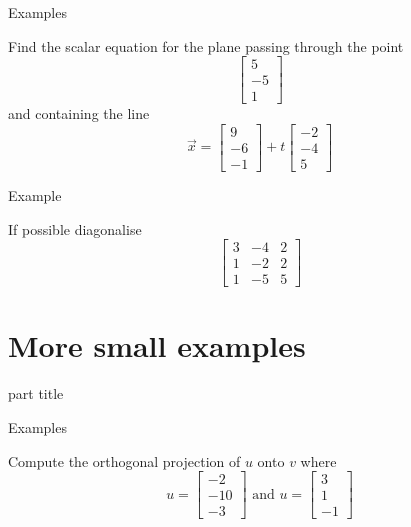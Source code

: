 \documentclass{beamer}
\begin{document}
\begin{frame}{Examples}
\begin{example}
	Find the scalar equation for the plane passing through the point
	\begin{equation*}
	\left[
	\begin{matrix}
	5\\
	-5\\
	1
	\end{matrix}
	\right]
	\end{equation*}
	and containing the line
	\begin{equation*}
	\vec{x} = \left[
	\begin{matrix}
	9\\
	-6\\
	-1
	\end{matrix}
	\right]+t \left[
	\begin{matrix}
	-2\\
	-4\\
	5
	\end{matrix}
	\right]
	\end{equation*}
\end{example}
\end{frame}

\begin{frame}{Example}
\begin{example}
If possible diagonalise
\[
\left[
\begin{matrix}
3&-4&2\\
1&-2&2\\
1&-5&5
\end{matrix}
\right]\]
\end{example}
\end{frame}

\section{More small examples}

\begin{frame}
\begin{beamercolorbox}[sep=12pt,center]{part title}
\insertsection\par
\end{beamercolorbox}
\end{frame}

\begin{frame}{Examples}
\begin{example}
	Compute the orthogonal projection of $u$ onto $v$ where
	\begin{equation*}
	u = \left[
	\begin{matrix}
	-2\\
	-10\\
	-3
	\end{matrix}
	\right]\text{ and } u = \left[
	\begin{matrix}
	3\\
	1\\
	-1
	\end{matrix}
	\right]
	\end{equation*}
\end{example}
\end{frame}
\end{document}
